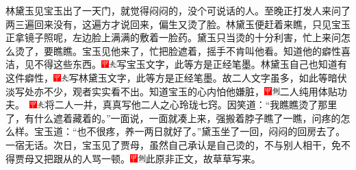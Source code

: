林黛玉见宝玉出了一天门，就觉得闷闷的，没个可说话的人。至晚正打发人来问了两三遍回来没有，这遍方才说回来，偏生又烫了脸。林黛玉便赶着来瞧，只见宝玉正拿镜子照呢，左边脸上满满的敷着一脸药。黛玉只当烫的十分利害，忙上来问怎么烫了，要瞧瞧。宝玉见他来了，忙把脸遮着，摇手不肯叫他看。知道他的癖性喜洁，见不得这些东西。{\includegraphics[width=3mm]{../Images/00002}\includegraphics[width=3mm]{../Images/00012}\footnotesize \kaishu 写宝玉文字，此等方是正经笔墨。}林黛玉自己也知道有这件癖性，{\includegraphics[width=3mm]{../Images/00002}\includegraphics[width=3mm]{../Images/00012}\footnotesize \kaishu 写林黛玉文字，此等方是正经笔墨。故二人文字虽多，如此等暗伏淡写处亦不少，观者实实看不出。}知道宝玉的心内怕他嫌脏，{\includegraphics[width=3mm]{../Images/00002}\includegraphics[width=3mm]{../Images/00011}\footnotesize \kaishu 二人纯用体贴功夫。　\includegraphics[width=3mm]{../Images/00002}\includegraphics[width=3mm]{../Images/00012}\footnotesize \kaishu 将二人一并，真真写他二人之心玲珑七窍。}因笑道：“我瞧瞧烫了那里了，有什么遮着藏着的。”一面说，一面就凑上来，强搬着脖子瞧了一瞧，问疼的怎么样。宝玉道：“也不很疼，养一两日就好了。”黛玉坐了一回，闷闷的回房去了。一宿无话。次日，宝玉见了贾母，虽然自己承认是自己烫的，不与别人相干，免不得贾母又把跟从的人骂一顿。{\includegraphics[width=3mm]{../Images/00002}\includegraphics[width=3mm]{../Images/00011}\footnotesize \kaishu 此原非正文，故草草写来。}

